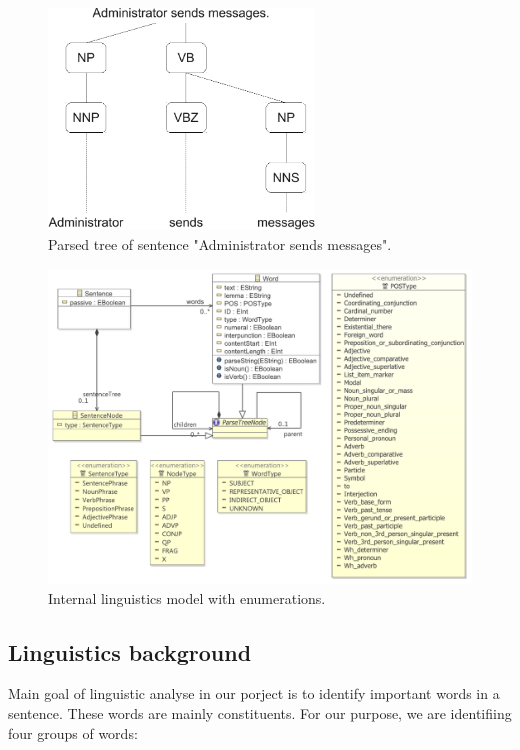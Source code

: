 \begin{figure}[ht]
  \centering
  \includegraphics[width=200pt]{images/ParsedTree}
  \caption{Parsed tree of sentence "Administrator sends messages".}
  \label{fig:ParsedTree}
\end{figure}

\begin{figure}[ht]
  \centering
  \includegraphics[width=\textwidth]{images/ReprotoolLingModel}
  \caption{Internal linguistics model with enumerations.}
  \label{fig:ReprotoolLingModel}
\end{figure}

\subsection{Linguistics background}

Main goal of linguistic analyse in our porject is to identify important words in a sentence. These words are mainly constituents. For our purpose, we are identifiing four groups of words:

